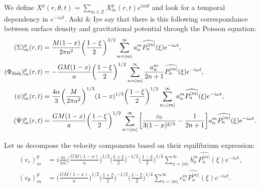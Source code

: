 \documentclass[11pt]{article}
\newcommand{\vr}{v_{r}}
\newcommand{\vt}{v_{\theta}}
\newcommand{\Phid}{\Phi_{\rm{disk}}}
\newcommand{\anm}{a_n^m}
\newcommand{\bnm}{b_n^m}
\newcommand{\cnm}{c_n^m}
\newcommand{\Pnm}{P_n^{|m|}}
\newcommand{\hPnm}{\widehat{\Pnm}}
\begin{document}
We define $X^p(r,\theta,t) = \sum_{m\in \mathbb{Z}} X_m^p(r,t) e^{i m \theta}$ and look for a temporal dependency in $e^{-i \omega t}$.
Aoki \& Iye say that there is this following correspondance between surface density and gravitational potential through the Poisson equation:
\begin{align}
(\Sigma)_m^p (r,t) &= \frac{M(1-x)}{2\pi a^2} \bigg(\frac{1-\xi}{2}\bigg)^{3/2} \sum_{n=|m|}^{\infty} \anm \hPnm(\xi) e^{-i \omega t} ,\\
(\Phid)_m^p (r,t) &= -\frac{GM(1-x)}{a} \bigg(\frac{1-\xi}{2}\bigg)^{1/2} \sum_{n=|m|}^{\infty} \frac{\anm}{2n+1} \hPnm(\xi) e^{-i \omega t} ,\\
(\psi)_m^p (r,t) &= \frac{4\alpha}{3}  \bigg(\frac{M}{2\pi a^2} \bigg)^{1/3} (1-x)^{1/3} \bigg(\frac{1-\xi}{2}\bigg)^{1/2} \sum_{n=|m|}^{\infty} \anm \hPnm(\xi) e^{-i \omega t} ,\\
(\Psi)_m^p (r,t) &= \frac{GM(1-x)}{a } \bigg(\frac{1-\xi}{2}\bigg)^{1/2}\sum_{n=|m|}^{\infty} \bigg[\frac{\varepsilon_0 }{3(1-x)^{2/3}}   -\frac{1}{2n+1}  \bigg]\anm \hPnm(\xi)e^{-i \omega t} .
\end{align}

Let us decompose the velocity components based on their equilibrium expression:
\begin{align}
(\vr)_m^p &= i \frac{m}{|m|} \bigg(\frac{GM(1-x)}{a}\bigg)^{1/2} \bigg(\frac{1+\xi}{2}\bigg)^{-1/2} \bigg(\frac{1-\xi}{2}\bigg)^{1/4} \sum_{n=|m|}^{\infty} \bnm \hPnm(\xi) e^{-i \omega t} ,\\
(\vt)_m^p &=\bigg(\frac{GM(1-x)}{a}\bigg)^{1/2} \bigg(\frac{1+\xi}{2}\bigg)^{-1/2} \bigg(\frac{1-\xi}{2}\bigg)^{1/4} \sum_{n=|m|}^{\infty} \cnm \hPnm(\xi) e^{-i \omega t} .
\end{align}
\end{document}
